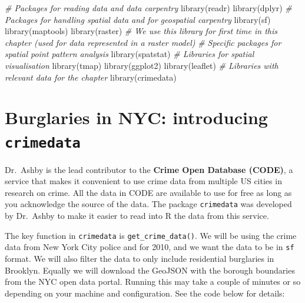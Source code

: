 \documentclass[
  krantz2]{krantz}
\makeatletter
\newenvironment{Shaded}{\begin{snugshade}}{\end{snugshade}}
\newcommand{\CommentTok}[1]{\textcolor[rgb]{0.37,0.37,0.37}{\textit{#1}}}
\newcommand{\FunctionTok}[1]{\textcolor[rgb]{0,0,0}{#1}}
\newcommand{\NormalTok}[1]{#1}
\newenvironment{kframe}{%
\medskip{}
\setlength{\fboxsep}{.8em}
 \def\at@end@of@kframe{}%
 \ifinner\ifhmode%
  \def\at@end@of@kframe{\end{minipage}}%
  \begin{minipage}{\columnwidth}%
 \fi\fi%
 \def\FrameCommand##1{\hskip\@totalleftmargin \hskip-\fboxsep
 \colorbox{shadecolor}{##1}\hskip-\fboxsep
     \hskip-\linewidth \hskip-\@totalleftmargin \hskip\columnwidth}%
 \MakeFramed {\advance\hsize-\width
   \@totalleftmargin\z@ \linewidth\hsize
   \@setminipage}}%
 {\par\unskip\endMakeFramed%
 \at@end@of@kframe}
\renewenvironment{Shaded}{\begin{kframe}}{\end{kframe}}
\makeatother
\begin{document}
\begin{Shaded}
\begin{Highlighting}[]
\CommentTok{\# Packages for reading data and data carpentry}
\FunctionTok{library}\NormalTok{(readr)}
\FunctionTok{library}\NormalTok{(dplyr)}
\CommentTok{\# Packages for handling spatial data and for geospatial carpentry}
\FunctionTok{library}\NormalTok{(sf)}
\FunctionTok{library}\NormalTok{(maptools)}
\FunctionTok{library}\NormalTok{(raster) }\CommentTok{\# We use this library for first time in this chapter (used for data represented in a raster model)}
\CommentTok{\# Specific packages for spatial point pattern analysis}
\FunctionTok{library}\NormalTok{(spatstat)}
\CommentTok{\# Libraries for spatial visualisation}
\FunctionTok{library}\NormalTok{(tmap)}
\FunctionTok{library}\NormalTok{(ggplot2)}
\FunctionTok{library}\NormalTok{(leaflet)}
\CommentTok{\# Libraries with relevant data for the chapter}
\FunctionTok{library}\NormalTok{(crimedata)}
\end{Highlighting}
\end{Shaded}

\hypertarget{burglaries-in-nyc-introducing-crimedata}{%
\section{\texorpdfstring{Burglaries in NYC: introducing \texttt{crimedata}}{Burglaries in NYC: introducing crimedata}}\label{burglaries-in-nyc-introducing-crimedata}}

Dr.~Ashby is the lead contributor to the \textbf{Crime Open Database (CODE)}, a service that makes it convenient to use crime data from multiple US cities in research on crime. All the data in CODE are available to use for free as long as you acknowledge the source of the data. The package \texttt{crimedata} was developed by Dr.~Ashby to make it easier to read into R the data from this service.

The key function in \texttt{crimedata} is \texttt{get\_crime\_data()}. We will be using the crime data from New York City police and for 2010, and we want the data to be in \texttt{sf} format. We will also filter the data to only include residential burglaries in Brooklyn. Equally we will download the GeoJSON with the borough boundaries from the NYC open data portal. Running this may take a couple of minutes or so depending on your machine and configuration. See the code below for details:
\end{document}
